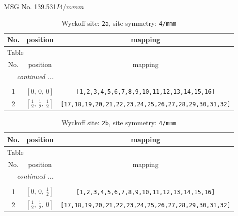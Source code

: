 \documentclass[fleqn,8pt]{jsarticle}
\begin{document}
\setcounter{MaxMatrixCols}{32}

\renewcommand{\tablename}{Table~}
\renewcommand{\figurename}{Figure~}
\begin{center}
\LARGE
MSG No. 139.531\quad$I4/mmm$
\end{center}
\renewcommand{\arraystretch}{1.2}
\begin{longtable}{ccc}
\caption{Wyckoff site: {\tt 2a}, site symmetry: {\tt 4/mmm}}
 \\
 \hline \hline
No. & position & mapping \\ \hline \endfirsthead

\multicolumn{2}{l}{\tablename\ \thetable{}} \\
 \hline \hline
No. & position & mapping \\ \hline \endhead

 \hline \hline
\multicolumn{2}{r}{\footnotesize\it continued ...} \\ \endfoot

 \hline \hline
\multicolumn{2}{r}{} \\ \endlastfoot

1 & $\left[ 0,\, 0,\, 0 \right]$ & {\tt [1,2,3,4,5,6,7,8,9,10,11,12,13,14,15,16]} \\ \hline
2 & $\left[ \frac{1}{2},\, \frac{1}{2},\, \frac{1}{2} \right]$ & {\tt [17,18,19,20,21,22,23,24,25,26,27,28,29,30,31,32]} \\
\end{longtable}
\renewcommand{\arraystretch}{1.2}
\begin{longtable}{ccc}
\caption{Wyckoff site: {\tt 2b}, site symmetry: {\tt 4/mmm}}
 \\
 \hline \hline
No. & position & mapping \\ \hline \endfirsthead

\multicolumn{2}{l}{\tablename\ \thetable{}} \\
 \hline \hline
No. & position & mapping \\ \hline \endhead

 \hline \hline
\multicolumn{2}{r}{\footnotesize\it continued ...} \\ \endfoot

 \hline \hline
\multicolumn{2}{r}{} \\ \endlastfoot

1 & $\left[ 0,\, 0,\, \frac{1}{2} \right]$ & {\tt [1,2,3,4,5,6,7,8,9,10,11,12,13,14,15,16]} \\ \hline
2 & $\left[ \frac{1}{2},\, \frac{1}{2},\, 0 \right]$ & {\tt [17,18,19,20,21,22,23,24,25,26,27,28,29,30,31,32]} \\
\end{longtable}
\end{document}
